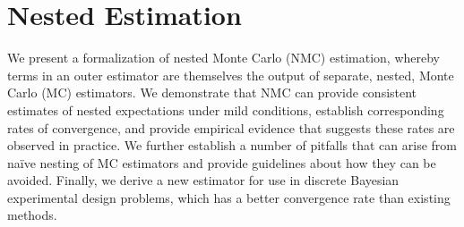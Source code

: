 
\chapter{Nested Estimation}
\label{chp:nest}

We present a formalization of nested Monte Carlo (NMC) estimation, whereby
terms in an outer estimator are themselves the output of separate, nested, Monte Carlo (MC) estimators.
We demonstrate that NMC can provide consistent estimates of 
nested expectations under mild conditions, 
establish corresponding rates of convergence, 
and provide empirical evidence that suggests these rates are observed in practice.
We further establish a number of pitfalls that can arise from na\"{i}ve nesting of MC estimators
and provide guidelines about how they can be avoided.
Finally, we derive a new estimator for use in discrete Bayesian 
experimental design problems, which has a better convergence rate than 
existing methods.










\clearpage

